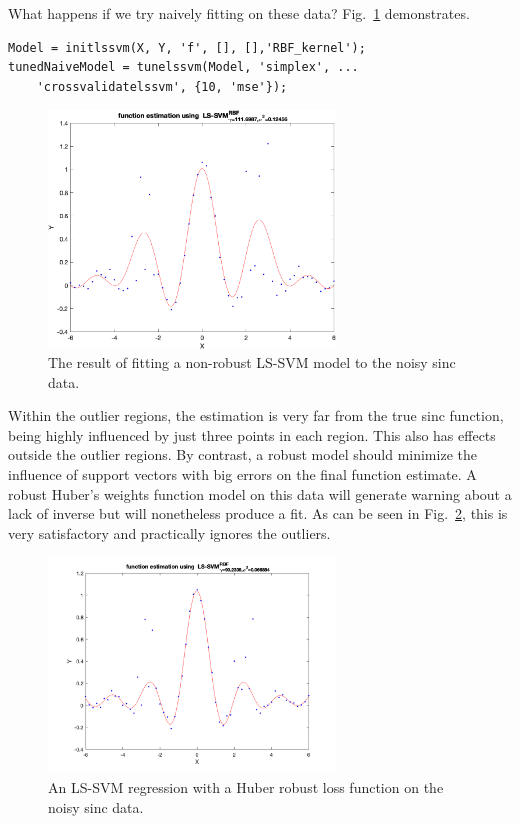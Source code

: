 \documentclass[10pt,a4paper]{article}
\begin{document}
What happens if we try naively fitting on these data? Fig.~\ref{fig:naiveNonRob} demonstrates.

\begin{lstlisting}[style=Matlab-editor]
Model = initlssvm(X, Y, 'f', [], [],'RBF_kernel');
tunedNaiveModel = tunelssvm(Model, 'simplex', ...
    'crossvalidatelssvm', {10, 'mse'});
\end{lstlisting}

\begin{figure}[h!]
  \includegraphics[width=3in]{naiveNonRob.png}
  \caption{The result of fitting a non-robust LS-SVM model to the noisy sinc data.}
  \label{fig:naiveNonRob}
\end{figure}


Within the outlier regions, the estimation is very far from the true sinc function, being highly influenced by just three points in each region. This also has effects outside the outlier regions. 
By contrast, a robust model should minimize the influence of support vectors with big errors on the final function estimate. A robust Huber's weights function model on this data will generate warning about a lack of inverse but will nonetheless produce a fit. As can be seen in Fig.~\ref{fig:whuberRobust}, this is very satisfactory and practically ignores the outliers.

\begin{figure}[h!]
  \includegraphics[width=3in]{whuberRobust.png}
  \caption{An LS-SVM regression with a Huber robust loss function on the noisy sinc data.}
  \label{fig:whuberRobust}
\end{figure}
\end{document}
